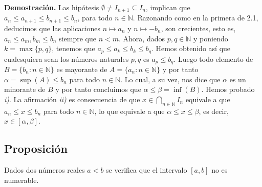 \documentclass[10pt,a4paper]{article}
\begin{document}
	\textbf{Demostración.} Las hipótesis $\emptyset \neq I_{n+1} \subseteq I_n$, implican que $a_n \leq a_{n+1} \leq b_{n+1} \leq b_n$, para todo $n \in \mathbb{N}$. Razonando como en la primera de 2.1, deducimos que las aplicaciones $n \mapsto a_n$ y $n \mapsto -b_n$, son crecientes, esto es, $a_n \leq a_m, b_m \leq b_n$ siempre que $n < m$. Ahora, dados $p, q \in \mathbb{N}$ y poniendo $k = \max\{p, q\}$, tenemos que $a_p \leq a_k \leq b_k \leq b_q$. Hemos obtenido así que cualesquiera sean los números naturales $p, q$ es $a_p \leq b_q$. Luego todo elemento de $B = \{b_n : n \in \mathbb{N}\}$ es mayorante de $A = \{a_n:n \in \mathbb{N}\}$ y por tanto $ \alpha = \sup(A) \leq b_n$ para todo $n \in \mathbb{N}$. Lo cual, a su vez, nos dice que $\alpha$ es un minorante de $B$ y por tanto concluimos que $\alpha \leq \beta = \inf(B)$. Hemos probado \textit{i)}. La afirmación \textit{ii)} es consecuencia de que $x \in \displaystyle \bigcap_{n \in \mathbb{N}}I_n$ equivale a que $a_n \leq x \leq b_n$ para todo $n \in \mathbb{N}$, lo que equivale a que $\alpha \leq x \leq \beta$, es decir, $x \in [\alpha, \beta]$.
	
	\subsection{Proposición}
	
	Dados dos números reales $ a < b$ se verifica que el intervalo $[a, b]$ no es numerable.
	
\end{document}
